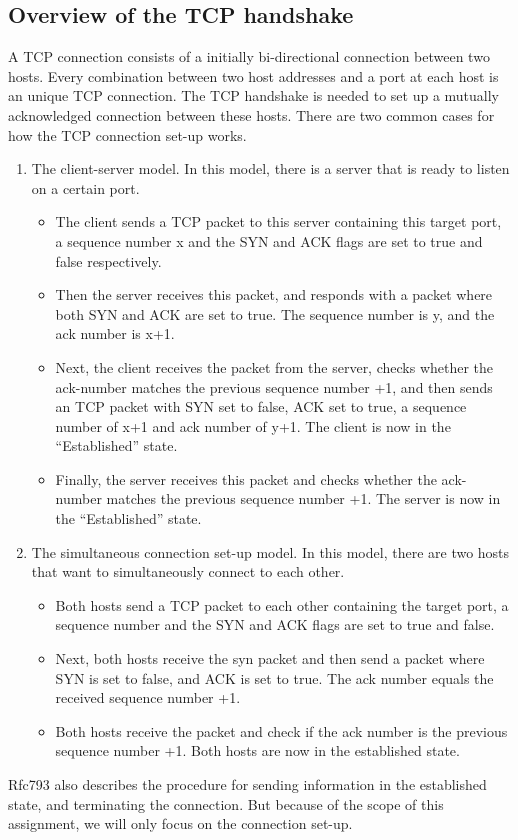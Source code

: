 \documentclass[twocolumn]{article}
\begin{document}
\subsection{Overview of the TCP handshake}
A TCP connection consists of a initially bi-directional connection between two hosts. Every combination between two host addresses and a port at each host is an unique TCP connection. The TCP handshake is needed to set up a mutually acknowledged connection between these hosts.
There are two common cases for how the TCP connection set-up works.
\begin{enumerate}
\item The client-server model. In this model, there is a server that is ready to listen on a certain port. 
\begin{itemize}
\item The client sends a TCP packet to this server containing this target port, a sequence number x and the SYN and ACK flags are set to true and false respectively.
\item Then the server receives this packet, and responds with a packet where both SYN and ACK are set to true. The sequence number is y, and the ack number is x+1.
\item Next, the client receives the packet from the server, checks whether the ack-number matches the previous sequence number +1, and then sends an TCP packet with SYN set to false, ACK set to true, a sequence number of x+1 and ack number of y+1. The client is now in the ``Established'' state.
\item Finally, the server receives this packet and checks whether the ack-number matches the previous sequence number +1. The server is now in the ``Established'' state.
\end{itemize}  
\item The simultaneous connection set-up model. In this model, there are two hosts that want to simultaneously connect to each other.
\begin{itemize}
\item Both hosts send a TCP packet to each other containing the target port, a sequence number and the SYN and ACK flags are set to true and false. 
\item Next, both hosts receive the syn packet and then send a packet where SYN is set to false, and ACK is set to true. The ack number equals the received sequence number +1.
\item Both hosts receive the packet and check if the ack number is the previous sequence number +1. Both hosts are now in the established state.
\end{itemize}
\end{enumerate}
Rfc793 also describes the procedure for sending information in the established state, and terminating the connection. But because of the scope of this assignment, we will only focus on the connection set-up.
\end{document}
